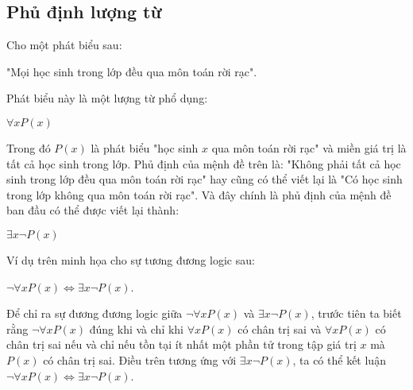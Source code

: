 \documentclass{standalone} %
\begin{document}
    \subsection{Phủ định lượng từ}
        
        Cho một phát biểu sau:
        \begin{center}
            "Mọi học sinh trong lớp đều qua môn toán rời rạc".
        \end{center}
        Phát biểu này là một lượng từ phổ dụng:
        \begin{center}
            $\forall x P(x)$
        \end{center}
        Trong đó $P(x)$ là phát biểu "học sinh $x$ qua môn toán rời rạc" và miền giá trị là tất cả học sinh trong lớp. Phủ định của mệnh đề trên là: "Không phải tất cả học sinh trong lớp đều qua môn toán rời rạc" hay cũng có thể viết lại là "Có học sinh trong lớp không qua môn toán rời rạc". Và đây chính là phủ định của mệnh đề ban đầu có thể được viết lại thành:
        \begin{center}
            $\exists x \neg  P(x)$
        \end{center}
        Ví dụ trên minh họa cho sự tương đương logic sau:
        \begin{theorem}
            \begin{center}
                $\neg \forall x P(x) \Leftrightarrow \exists x \neg P(x)$.
            \end{center}
        \end{theorem}
        
        Để chỉ ra sự đương đương logic giữa $\neg \forall x P(x)$ và $\exists x \neg P(x)$, trước tiên ta biết rằng $\neg \forall x P(x)$ đúng khi và chỉ khi $\forall x P(x)$ có chân trị sai và $\forall x P(x)$ có chân trị sai nếu và chỉ nếu tồn tại ít nhất một phần tử trong tập giá trị $x$ mà $P(x)$ có chân trị sai. Điều trên tương ứng với $\exists x \neg P(x)$, ta có thể kết luận $\neg \forall x P(x) \Leftrightarrow \exists x \neg P(x)$.
        
\end{document}
